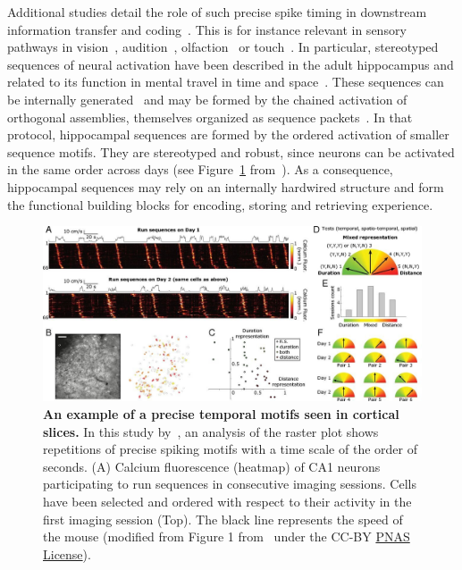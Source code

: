 \documentclass[brainsci, %
               review,submit,pdftex,moreauthors
               ]{Definitions/mdpi}
\begin{document}
Additional studies detail the role of such precise spike timing in downstream information transfer and coding~\citep{villette_internally_2015,branco_dendritic_2010,luczak_packet-based_2015}. This is for instance relevant in sensory pathways in vision~\citep{meister_concerted_1995}, audition~\citep{decharms_primary_1996}, olfaction~\citep{wehr_odour_1996} or touch~\citep{johansson_first_2004}.  In particular, stereotyped sequences of neural activation have been described in the adult hippocampus and related to its function in mental travel in time and space~\citep{buzsaki_space_2018}. These sequences can be internally generated~\citep{pastalkova_internally_2008,villette_internally_2015} and may be formed by the chained activation of orthogonal assemblies, themselves organized as sequence packets~\citep{malvache_awake_2016}. In that protocol, hippocampal sequences are formed by the ordered activation of smaller sequence motifs. They are stereotyped and robust, since neurons can be activated in the same order across days (see Figure~\ref{fig:haimerl} from~\citep{haimerl_internal_2019}). As a consequence, hippocampal sequences may rely on an internally hardwired structure and form the functional building blocks for encoding, storing and retrieving experience.
%
\begin{figure}
\centering
\includegraphics[width=\linewidth]{figures/haimerl2019.jpg}
\caption{\textbf{An example of a precise temporal motifs seen in cortical slices.} In this study by~\citep{haimerl_internal_2019}, an analysis of the raster plot shows repetitions of precise spiking motifs with a time scale of the order of seconds. (A) Calcium fluorescence (heatmap) of CA1 neurons participating to run sequences in consecutive imaging sessions. Cells have been selected and ordered with respect to their activity in the first imaging session (Top). The black line represents the speed of the mouse (modified from Figure 1 from~\citep{haimerl_internal_2019} under the CC-BY \href{https://www.pnas.org/doi/full/10.1073/pnas.1718518116}{PNAS License}).}\label{fig:haimerl}
\end{figure}
\end{document}
